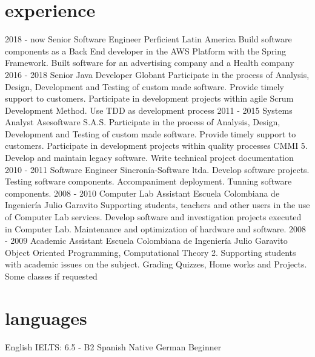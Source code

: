 \documentclass[]{twentysecondcv}
\begin{document}
\section{experience}

\begin{twentyshort}
\twentyitem
    {2018 - now}
    {Senior Software Engineer}
    {Perficient Latin America}
    {Build software components as a Back End developer in the AWS Platform with the Spring Framework. Built software for an advertising company and a Health company}
\twentyitem
    {2016 - 2018}
    {Senior Java Developer}
    {Globant}
    {Participate in the process of Analysis, Design, Development and Testing of custom made software. Provide timely support to customers. Participate in development projects within agile Scrum Development Method. Use TDD as development process}
  \twentyitem
    {2011 - 2015}
    {Systems Analyst}
    {Asesoftware S.A.S.}
    {Participate in the process of Analysis, Design, Development and Testing of custom made software. Provide timely support to customers. Participate in development projects within quality processes CMMI 5. Develop and maintain legacy software. Write technical project documentation}
  \twentyitem
    {2010 - 2011}
    {Software Engineer}
    {Sincron\'ia-Software ltda.}
    {Develop software projects. Testing software components. Accompaniment deployment. Tunning software components.}
\twentyitem
    {2008 - 2010}
    {Computer Lab Assistant}
    {Escuela Colombiana de Ingenier\'ia  Julio Garavito}
    {Supporting students, teachers and other users in the use of Computer Lab services. Develop software and investigation projects executed in Computer Lab. Maintenance and optimization of hardware and software.}
\twentyitem
    {2008 - 2009}
    {Academic Assistant}
    {Escuela Colombiana de Ingenier\'ia  Julio Garavito}
    {Object Oriented Programming, Computational Theory 2. Supporting students with academic issues on the subject. Grading Quizzes, Home works and Projects. Some classes if requested}
\end{twentyshort}

\section{languages}

\begin{twentyshort}
 \twentyitemshort
    {English}
    {IELTS: 6.5 - B2}
  \twentyitemshort
    {Spanish}
    {Native}
  \twentyitemshort
    {German}
    {Beginner}
\end{twentyshort}
\end{document}
